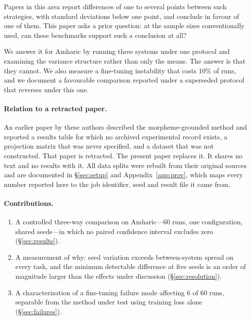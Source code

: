 \documentclass[11pt]{article}
\begin{document}
Papers in this area report differences of one to several points between such
strategies, with standard deviations below one point, and conclude in favour
of one of them. This paper asks a prior question: at the sample sizes
conventionally used, can these benchmarks support such a conclusion at all?

We answer it for Amharic by running three systems under one protocol and
examining the variance structure rather than only the means. The answer is
that they cannot. We also measure a fine-tuning instability that costs 10\%
of runs, and we document a favourable comparison reported under a superseded
protocol that reverses under this one.

\paragraph{Relation to a retracted paper.} An earlier paper by these authors
described the morpheme-grounded method and reported a results table for which
no archived experimental record exists, a projection matrix that was never
specified, and a dataset that was not constructed. That paper
\citep{teklehaymanot-etal-2026-lgse} is retracted. The present paper replaces
it. It shares no text and no results with it. All data splits were rebuilt
from their original sources and are documented in \S\ref{sec:setup} and
Appendix~\ref{app:prov}, which maps every number reported here to the job
identifier, seed and result file it came from.

\paragraph{Contributions.}
\begin{enumerate}
\itemsep0em
\item A controlled three-way comparison on Amharic---60 runs, one
  configuration, shared seeds---in which no paired confidence interval
  excludes zero (\S\ref{sec:results}).
\item A measurement of why: seed variation exceeds between-system spread on
  every task, and the minimum detectable difference at five seeds is an
  order of magnitude larger than the effects under discussion
  (\S\ref{sec:resolution}).
\item A characterization of a fine-tuning failure mode affecting 6 of 60
  runs, separable from the method under test using training loss alone
  (\S\ref{sec:failures}).
\end{enumerate}
\end{document}
